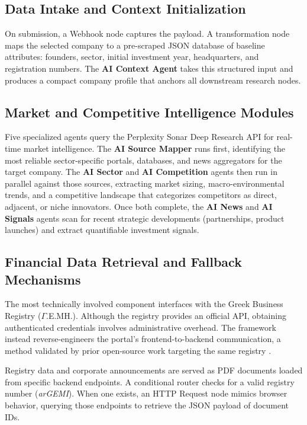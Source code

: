 \documentclass[12pt]{article}
\begin{document}
\subsection{Data Intake and Context Initialization}
\label{sec:intake}
On submission, a Webhook node captures the payload. A transformation node maps the selected
company to a pre-scraped JSON database of baseline attributes: founders, sector, initial
investment year, headquarters, and registration numbers. The \textbf{AI Context Agent} takes this
structured input and produces a compact company profile that anchors all downstream research nodes.

\subsection{Market and Competitive Intelligence Modules}
Five specialized agents query the Perplexity Sonar Deep Research API
\parencite{perplexity2024sonar} for real-time market intelligence. The \textbf{AI Source Mapper}
runs first, identifying the most reliable sector-specific portals, databases, and news aggregators
for the target company. The \textbf{AI Sector} and \textbf{AI Competition} agents then run in
parallel against those sources, extracting market sizing, macro-environmental trends, and a
competitive landscape that categorizes competitors as direct, adjacent, or niche innovators. Once
both complete, the \textbf{AI News} and \textbf{AI Signals} agents scan for recent strategic
developments (partnerships, product launches) and extract quantifiable investment signals.

\subsection{Financial Data Retrieval and Fallback Mechanisms}
\label{sec:financials}

The most technically involved component interfaces with the Greek Business Registry
($\Gamma$.E.MH.). Although the registry provides an official API, obtaining authenticated
credentials involves administrative overhead. The framework instead reverse-engineers the portal's
frontend-to-backend communication, a method validated by prior open-source work targeting the same
registry \parencite{drakakis2025govdoc}.

Registry data and corporate announcements are served as PDF documents loaded from specific backend
endpoints. A conditional router checks for a valid registry number (\textit{arGEMI}). When one
exists, an HTTP Request node mimics browser behavior, querying those endpoints to retrieve the
JSON payload of document IDs.
\end{document}
